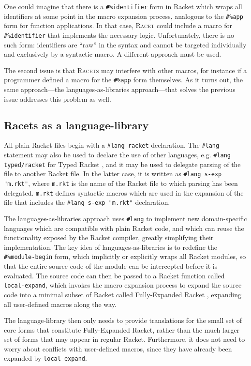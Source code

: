 \documentclass{article}
\begin{document}
One could imagine that there is a \texttt{\#\%identifier} form in Racket which wraps all identifiers at some point in the macro expansion process, analogous to the \texttt{\#\%app} form for function applications. In that case, \textsc{Racet} could include a macro for \texttt{\#\%identifier} that implements the necessary logic. Unfortunately, there is no such form: identifiers are ``raw'' in the syntax and cannot be targeted individually and exclusively by a syntactic macro. A different approach must be used.

The second issue is that \textsc{Racets} may interfere with other macros, for instance if a programmer defined a macro for the \texttt{\#\%app} form themselves. As it turns out, the same approach---the languages-as-libraries approach---that solves the previous issue addresses this problem as well.


\subsection{Racets as a language-library}
All plain Racket files begin with a \texttt{\#lang racket} declaration. The \texttt{\#lang} statement may also be used to declare the use of other languages, e.g. \texttt{\#lang typed/racket} for Typed Racket \cite{typed-racket}, and it may be used to delegate parsing of the file to another Racket file. In the latter case, it is written as \texttt{\#lang s-exp "m.rkt"}, where \texttt{m.rkt} is the name of the Racket file to which parsing has been delegated. \texttt{m.rkt} defines syntactic macros which are used in the expansion of the file that includes the \texttt{\#lang s-exp "m.rkt"} declaration.

The languages-as-libraries approach \cite{lang-as-lib} uses \texttt{\#lang} to implement new domain-specific languages which are compatible with plain Racket code, and which can reuse the functionality exposed by the Racket compiler, greatly simplifying their implementation. The key idea of languages-as-libraries is to redefine the \texttt{\#\%module-begin} form, which implicitly or explicitly wraps all Racket modules, so that the entire source code of the module can be intercepted before it is evaluated. The source code can then be passed to a Racket function called \texttt{local-expand}, which invokes the macro expansion process to expand the source code into a minimal subset of Racket called Fully-Expanded Racket \cite{fe-racket}, expanding all user-defined macros along the way.

The language-library then only needs to provide translations for the small set of core forms that constitute Fully-Expanded Racket, rather than the much larger set of forms that may appear in regular Racket. Furthermore, it does not need to worry about conflicts with user-defined macros, since they have already been expanded by \texttt{local-expand}.
\end{document}

